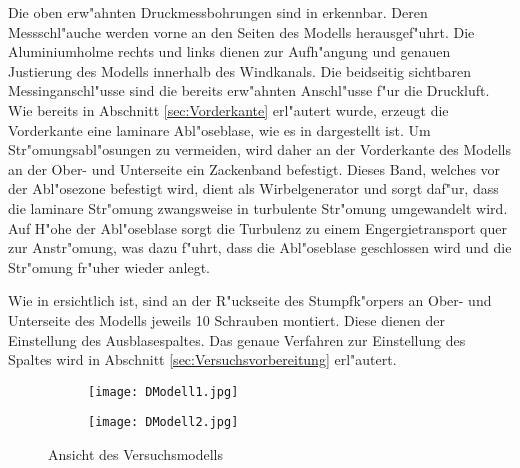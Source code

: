 Die oben erw"ahnten Druckmessbohrungen sind in  erkennbar. Deren Messschl"auche werden vorne an den Seiten des Modells herausgef"uhrt. Die Aluminiumholme rechts und links dienen zur Aufh"angung und genauen Justierung des Modells innerhalb des Windkanals. Die beidseitig sichtbaren Messinganschl"usse sind die bereits erw"ahnten Anschl"usse f"ur die Druckluft.
Wie bereits in Abschnitt \ref{sec:Vorderkante} erl"autert wurde, erzeugt die Vorderkante eine laminare Abl"oseblase, wie es in  dargestellt ist. Um Str"omungsabl"osungen zu vermeiden, wird daher an der Vorderkante des Modells an der Ober- und Unterseite ein Zackenband befestigt. Dieses Band, welches vor der Abl"osezone befestigt wird, dient als Wirbelgenerator und sorgt daf"ur, dass die laminare Str"omung zwangsweise in turbulente Str"omung umgewandelt wird. Auf H"ohe der Abl"oseblase sorgt die Turbulenz zu einem Engergietransport quer zur Anstr"omung, was dazu f"uhrt, dass die Abl"oseblase geschlossen wird und die Str"omung fr"uher wieder anlegt.

Wie in  ersichtlich ist, sind an der R"uckseite des Stumpfk"orpers an Ober- und Unterseite des Modells jeweils 10 Schrauben montiert. Diese dienen der Einstellung des Ausblasespaltes. Das genaue Verfahren zur Einstellung des Spaltes wird in Abschnitt \ref{sec:Versuchsvorbereitung} erl"autert.


\begin{figure}[h]
	\centering
	\begin{subfigure}[c]{0.49\textwidth}		
		\texttt{[image: DModell1.jpg]}
		\label{fig:DModell1}
	\end{subfigure}
	\begin{subfigure}[c]{0.49\textwidth}
		\texttt{[image: DModell2.jpg]}
		\label{fig:DModell2}
	\end{subfigure}
	\caption{Ansicht des Versuchsmodells}
	\label{fig:DModell}
\end{figure}



